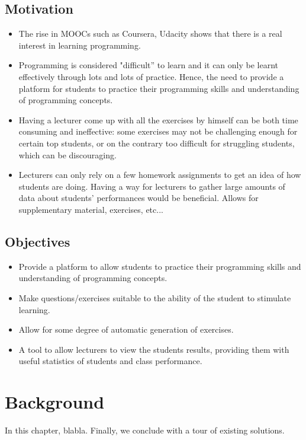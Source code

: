 \documentclass[11pt,a4paper]{report}
\begin{document}
\section{Motivation}
\begin{itemize}
\item The rise in MOOCs such as Coursera, Udacity shows that there is a real interest in learning programming.
\item Programming is considered "difficult'' to learn and it can only be learnt effectively through lots and lots of practice. Hence, the need to provide a platform for students to practice their programming skills and understanding of programming concepts.
\item Having a lecturer come up with all the exercises by himself can be both time consuming and ineffective: some exercises may not be challenging enough for certain top students, or on the contrary too difficult for struggling students, which can be discouraging.
\item Lecturers can only rely on a few homework assignments to get an idea of how students are doing. Having a way for lecturers to gather large amounts of data about students' performances would be beneficial. Allows for supplementary material, exercises, etc...
\end{itemize}

\section{Objectives}
\begin{itemize}
\item Provide a platform to allow students to practice their programming skills and understanding of programming concepts.
\item Make questions/exercises suitable to the ability of the student to stimulate learning.
\item Allow for some degree of automatic generation of exercises.
\item A tool to allow lecturers to view the students results, providing them with useful statistics of students and class performance.
\end{itemize}


\chapter{Background}
In this chapter, blabla. Finally, we conclude with a tour of existing solutions.
\end{document}

